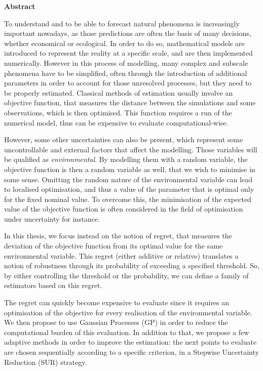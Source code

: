 \vfill

\scriptsize
{}
{}
\begin{center}
 \small \bf Abstract
\end{center}
\vspace{0.3cm}

To understand and to be able to forecast natural phenomena is
increasingly important nowadays, as those predictions are often the
basis of many decisions, whether economical or ecological. In order to
do so, mathematical models are introduced to represent the reality at
a specific scale, and are then implemented numerically. However in
this process of modelling, many complex and subscale phenomena have to
be simplified, often through the introduction of additional parameters
in order to account for those unresolved processes, but they need to
be properly estimated. Classical methods of estimation usually involve
an objective function, that measures the distance between the
simulations and some observations, which is then optimised. This
function requires a run of the numerical model, thus can be expensive
to evaluate computational-wise.

However, some other uncertainties can also be present, which represent
some uncontrollable and external factors that affect the
modelling. Those variables will be qualified as
\emph{environmental}. By modelling them with a random variable, the
objective function is then a random variable as well, that we wish to
minimise in some sense. Omitting the random nature of the
environmental variable can lead to localised optimisation, and thus a
value of the parameter that is optimal only for the fixed nominal
value.  To overcome this, the minimisation of the expected value of
the objective function is often considered in the field of
optimisation under uncertainty for instance.

In this thesis, we focus instead on the notion of regret, that
measures the deviation of the objective function from its optimal
value for the same environmental variable. This regret (either
additive or relative) translates a notion of robustness through its
probability of exceeding a specified threshold. So, by either
controlling the threshold or the probability, we can define a family
of estimators based on this regret.

The regret can quickly become expensive to evaluate since it requires
an optimisation of the objective for every realisation of the
environmental variable. We then propose to use Gaussian Processes (GP)
in order to reduce the computational burden of this evaluation. In
addition to that, we propose a few adaptive methods in order to
improve the estimation: the next points to evaluate are chosen
sequentially according to a specific criterion, in a Stepwise
Uncertainty Reduction (SUR) strategy.


